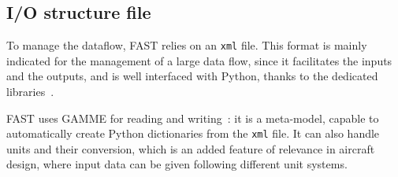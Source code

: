 \subsection{I/O structure file}
\label{subsec:chap2_fast_xml_struc}

To manage the dataflow, FAST relies on an \texttt{xml} file. 
This format is mainly indicated for the management of a large data flow, since it facilitates the inputs and the outputs, and is well interfaced with Python, thanks to the dedicated libraries~\cite{bib:nagel_cpacs}. 

FAST uses GAMME for reading and writing~\cite{bib:bedouet}: it is a meta-model, capable to automatically create Python dictionaries from the \texttt{xml} file. 
It can also handle units and their conversion, which is an added feature of relevance in aircraft design, where input data can be given following different unit systems.

